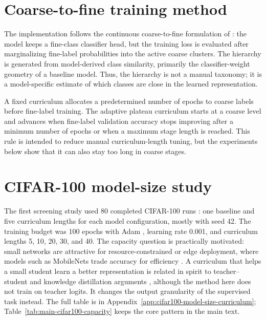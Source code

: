 \documentclass[english,master,a4paper,oneside]{ppfcmthesis}
\begin{document}
\section{Coarse-to-fine training method}

The implementation follows the continuous coarse-to-fine formulation of \citet{stretcuCoarsetoFineCurriculumLearning2021}: the model keeps a
fine-class classifier head, but the training loss is evaluated after
marginalizing fine-label probabilities into the active coarse clusters. The
hierarchy is generated from model-derived class similarity, primarily the
classifier-weight geometry of a baseline model. Thus, the hierarchy is not a
manual taxonomy; it is a model-specific estimate of which classes are close in
the learned representation.

A fixed curriculum allocates a predetermined number of epochs to coarse labels
before fine-label training. The adaptive plateau curriculum starts at a coarse
level and advances when fine-label validation accuracy stops improving after a
minimum number of epochs or when a maximum stage length is reached. This rule is
intended to reduce manual curriculum-length tuning, but the experiments below
show that it can also stay too long in coarse stages.

\section{CIFAR-100 model-size study}

The first screening study used 80 completed CIFAR-100 runs
\citep{krizhevsky2009learning}: one baseline and five curriculum lengths for
each model configuration, mostly with seed 42. The training budget was 100
epochs with Adam \citep{kingma2015adam}, learning rate 0.001, and curriculum
lengths 5, 10, 20, 30, and 40. The capacity question is practically motivated:
small networks are attractive for resource-constrained or edge deployment,
where models such as MobileNets trade accuracy for efficiency
\citep{howard2017mobilenets}. A curriculum that helps a small student learn a
better representation is related in spirit to teacher--student and knowledge
distillation arguments \citep{hinton2015distilling}, although the method here
does not train on teacher logits. It changes the output granularity of the
supervised task instead. The full table is in
Appendix~\ref{app:cifar100-model-size-curriculum}; Table~\ref{tab:main-cifar100-capacity}
keeps the core pattern in the main text.
\end{document}
